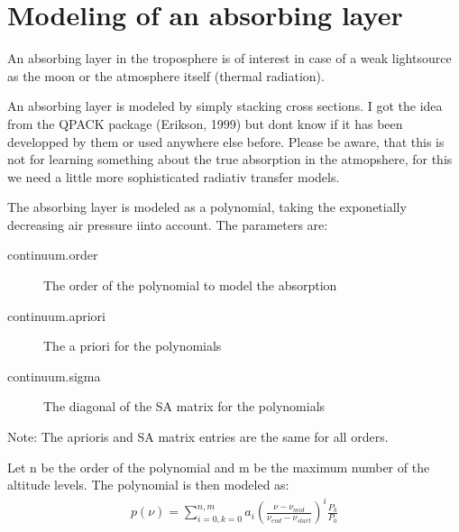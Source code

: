 \documentclass{article}
\begin{document}
\section{Modeling of an absorbing layer}

An absorbing layer in the troposphere is of interest in case of a weak
lightsource as the moon or the atmosphere itself (thermal radiation). 

An absorbing layer is modeled by simply stacking cross sections. I got
the idea from the QPACK package (Erikson, 1999) but dont know if it
has been developped by them or used anywhere else before. Please be aware, that this is not for learning something about the true absorption in the atmopshere, for this we need a little more sophisticated radiativ transfer models.

The absorbing layer is modeled as a polynomial, taking the
exponetially decreasing air pressure iinto account. The parameters are:
\begin{description}
\item[continuum.order] The order of the polynomial to model the absorption
\item[continuum.apriori] The a priori for the polynomials 
\item[continuum.sigma]  The diagonal of the SA matrix for the polynomials
\end{description}
Note: The aprioris and SA matrix entries are the same for all orders.

Let n be the order of the polynomial and m be the maximum number of
the altitude levels. The polynomial is then modeled as:
\begin{eqnarray}
  p(\nu) = \sum_{i=0,k=0}^{n,m} a_i \left(\frac{\nu - \nu_{mid}}{\nu_{end} - \nu_{start}}\right)^i \frac{P_k}{P_0}
\end{eqnarray}
\end{document}
